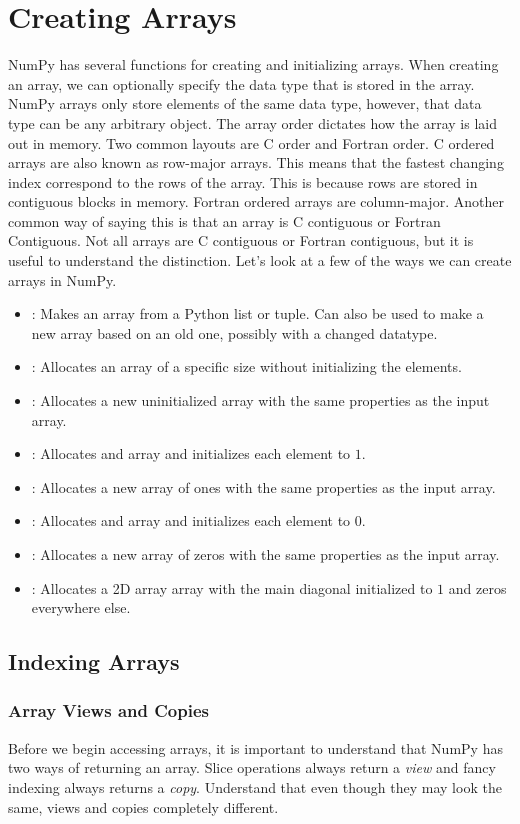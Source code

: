 \section*{Creating Arrays}
NumPy has several functions for creating and initializing arrays.
When creating an array, we can optionally specify the data type that is stored in the array.
NumPy arrays only store elements of the same data type, however, that data type can be any arbitrary object.
The array order dictates how the array is laid out in memory.
Two common layouts are C order and Fortran order.
C ordered arrays are also known as row-major arrays.
This means that the fastest changing index correspond to the rows of the array.
This is because rows are stored in contiguous blocks in memory.
Fortran ordered arrays are column-major.
Another common way of saying this is that an array is C contiguous or Fortran Contiguous.
Not all arrays are C contiguous or Fortran contiguous, but it is useful to understand the distinction.
Let's look at a few of the ways we can create arrays in NumPy.
\begin{itemize}
\item {}: Makes an array from a Python list or tuple.
Can also be used to make a new array based on an old one, possibly with a changed datatype.
\item {}: Allocates an array of a specific size without initializing the elements.
\item {}: Allocates a new uninitialized array with the same properties as the input array.
\item {}: Allocates and array and initializes each element to $1$.
\item {}: Allocates a new array of ones with the same properties as the input array.
\item {}: Allocates and array and initializes each element to $0$.
\item {}: Allocates a new array of zeros with the same properties as the input array.
\item {}: Allocates a 2D array array with the main diagonal initialized to $1$ and zeros everywhere else.
\end{itemize}

\subsection*{Indexing Arrays}
\subsubsection*{Array Views and Copies}
Before we begin accessing arrays, it is important to understand that NumPy has two ways of returning an array.
Slice operations always return a \emph{view} and fancy indexing always returns a \emph{copy}.
Understand that even though they may look the same, views and copies completely different.

